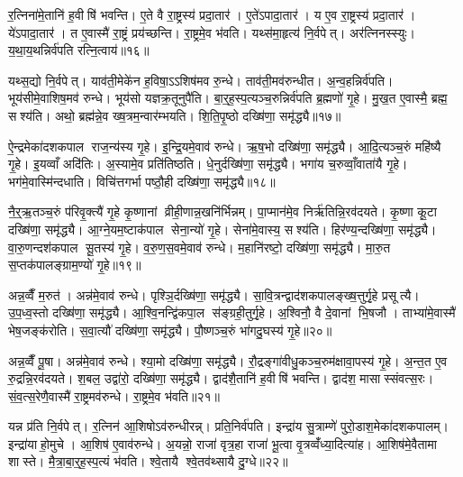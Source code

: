 र॒त्निना॑मे॒तानि॑ ह॒वीषि॑ भवन्ति। ए॒ते वै रा॒ष्ट्रस्य॑ प्रदा॒तार॑। ए॒ते॑ऽपादा॒तार॑। य ए॒व रा॒ष्ट्रस्य॑ प्रदा॒तार॑। ये॑ऽपादा॒तार॑। त ए॒वास्मै॑ रा॒ष्ट्रं प्रय॑च्छन्ति। रा॒ष्ट्रमे॒व भ॑वति। यथ्स॑मा॒हृत्य॑ नि॒र्वपेत्। अर॑त्निनस्स्युः। य॒था॒य॒थन्निर्व॑पति रत्नि॒त्वाय॑॥१६॥

यथ्स॒द्यो नि॒र्वपेत्। याव॑ती॒मेके॑न ह॒विषा॒ऽऽशिष॑मव रु॒न्धे। ताव॑ती॒मव॑रुन्धीत। अ॒न्व॒हन्निर्व॑पति। भूय॑सीमे॒वाशिष॒मव॑ रुन्धे। भूय॑सो यज्ञक्र॒तूनुपै॑ति। बा॒र्॒ह॒स्प॒त्यञ्च॒रुन्निर्व॑पति ब्र॒ह्मणो॑ गृ॒हे। मु॒ख॒त ए॒वास्मै॒ ब्रह्म॒ सश्य॑ति। अथो॒ ब्रह्म॑न्ने॒व ख्ष॒त्रम॒न्वार॑म्भयति। शि॒ति॒पृ॒ष्ठो दख्षि॑णा॒ समृ॑द्ध्यै॥१७॥

ऐ॒न्द्रमेका॑दशकपाल राज॒न्य॑स्य गृ॒हे। इ॒न्द्रि॒यमे॒वाव॑ रुन्धे। ऋ॒ष॒भो दख्षि॑णा॒ समृ॑द्ध्यै। आ॒दि॒त्यञ्च॒रुं महि॑ष्यै गृ॒हे। इ॒यव्वाँ अदि॑तिः। अ॒स्यामे॒व प्रति॑तिष्ठति। धे॒नुर्दख्षि॑णा॒ समृ॑द्ध्यै। भगा॑य च॒रुव्वाँ॒वाता॑यै गृ॒हे। भग॑मे॒वास्मि॑न्दधाति। विचि॑त्तगर्भा पष्ठौ॒ही दख्षि॑णा॒ समृ॑द्ध्यै॥१८॥

नै॒र्॒ऋ॒तञ्च॒रुं प॑रिवृ॒क्त्यै॑ गृ॒हे कृ॒ष्णानां व्रीही॒णान्न॒खनि॑र्भिन्नम्। पा॒प्मान॑मे॒व निर्\mbox{}ऋ॑तिन्नि॒रव॑दयते। कृ॒ष्णा कू॒टा दख्षि॑णा॒ समृ॑द्ध्यै। आ॒ग्ने॒यम॒ष्टाक॑पाल सेना॒न्यो॑ गृ॒हे। सेना॑मे॒वास्य॒ सश्य॑ति। हिर॑ण्य॒न्दख्षि॑णा॒ समृ॑द्ध्यै। वा॒रु॒णन्दश॑कपाल सू॒तस्य॑ गृ॒हे। व॒रु॒ण॒स॒वमे॒वाव॑ रुन्धे। म॒हानि॑रष्टो॒ दख्षि॑णा॒ समृ॑द्ध्यै। मा॒रु॒त स॒प्तक॑पालङ्ग्राम॒ण्यो॑ गृ॒हे॥१९॥

अन्न॒व्वैँ म॒रुत॑। अन्न॑मे॒वाव॑ रुन्धे। पृश्ञि॒र्दख्षि॑णा॒ समृ॑द्ध्यै। सा॒वि॒त्रन्द्वाद॑शकपालङ्ख्ष॒त्तुर्गृ॒हे प्रसूत्यै। उ॒प॒ध्व॒स्तो दख्षि॑णा॒ समृ॑द्ध्यै। आ॒श्वि॒नन्द्वि॑कपा॒ल स॑ङ्ग्रही॒तुर्गृ॒हे। अ॒श्विनौ॒ वै दे॒वानां भि॒षजौ। ताभ्या॑मे॒वास्मै॑ भेष॒जङ्क॑रोति। स॒वा॒त्यौ॑ दख्षि॑णा॒ समृ॑द्ध्यै। पौ॒ष्णञ्च॒रुं भा॑गदु॒घस्य॑ गृ॒हे॥२०॥

अन्न॒व्वैँ पू॒षा। अन्न॑मे॒वाव॑ रुन्धे। श्या॒मो दख्षि॑णा॒ समृ॑द्ध्यै। रौ॒द्रङ्गा॑वीधु॒कञ्च॒रुम॑क्षावा॒पस्य॑ गृ॒हे। अ॒न्त॒त ए॒व रु॒द्रन्नि॒रव॑दयते। श॒बल॒ उद्वा॑रो॒ दख्षि॑णा॒ समृ॑द्ध्यै। द्वाद॑शै॒तानि॑ ह॒वीषि॑ भवन्ति। द्वाद॑श॒ मासास्संवत्स॒रः। सं॒व॒त्स॒रेणै॒वास्मै॑ रा॒ष्ट्रमव॑रुन्धे। रा॒ष्ट्रमे॒व भ॑वति॥२१॥

यन्न प्र॑ति नि॒र्वपेत्। र॒त्निन॑ आ॒शिषोऽव॑रुन्धीरन्न्। प्रति॒निर्व॑पति। इन्द्रा॑य सु॒त्राम्णे॑ पुरो॒डाश॒मेका॑दशकपालम्। इन्द्रा॑याहो॒मुचे। आ॒शिष॑ ए॒वाव॑रुन्धे। अ॒यन्नो॒ राजा॑ वृत्र॒हा राजा॑ भू॒त्वा वृ॒त्रव्वँ॑ध्या॒दित्या॑ह। आ॒शिष॑मे॒वैतामा शास्ते। मै॒त्रा॒बा॒र्॒ह॒स्प॒त्यं भ॑वति। श्वे॒तायै श्वे॒तव॑थ्सायै दु॒ग्धे॥२२॥

